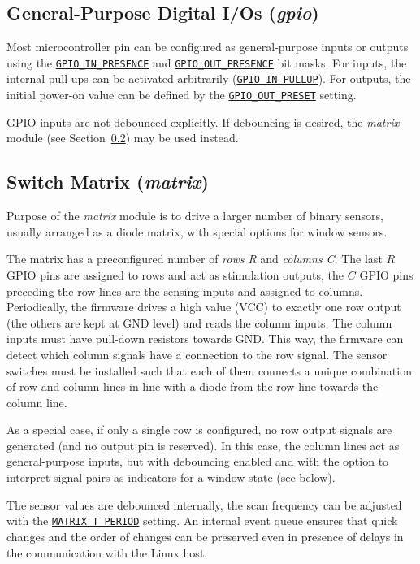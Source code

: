 \documentclass[12pt,english,parskip=half,headheight=19pt]{scrreprt}
\newcommand{\refapic}[1]{\href{home2l-api_c/index.html}{\mbox{\texttt{#1}}}}            %
\begin{document}
\subsection{General-Purpose Digital I/Os (\textit{gpio})}
\label{sec:brownies-features-gpio}

Most microcontroller pin can be configured as general-purpose inputs or outputs using the  \refapic{GPIO\_IN\_PRESENCE} and \refapic{GPIO\_OUT\_PRESENCE} bit masks. For inputs, the internal pull-ups can be activated arbitrarily (\refapic{GPIO\_IN\_PULLUP}). For outputs, the initial power-on value can be defined by the \refapic{GPIO\_OUT\_PRESET} setting.

GPIO inputs are not debounced explicitly. If debouncing is desired, the \textit{matrix} module (see Section~\ref{sec:brownies-features-matrix}) may be used instead.



\subsection{Switch Matrix (\textit{matrix})}
\label{sec:brownies-features-matrix}

Purpose of the \textit{matrix} module is to drive a larger number of binary sensors, usually arranged as a diode matrix, with special options for window sensors.

The matrix has a preconfigured number of \textit{rows R} and \textit{columns C}. The last $R$ GPIO pins are assigned to rows and act as stimulation outputs, the $C$ GPIO pins preceding the row lines are the sensing inputs and assigned to columns. Periodically, the firmware drives a high value (VCC) to exactly one row output (the others are kept at GND level) and reads the column inputs. The column inputs must have pull-down resistors towards GND. This way, the firmware can detect which column signals have a connection to the row signal. The sensor switches must be installed such that each of them connects a unique combination of row and column lines in line with a diode from the row line towards the column line.

As a special case, if only a single row is configured, no row output signals are generated (and no output pin is reserved). In this case, the column lines act as general-purpose inputs, but with debouncing enabled and with the option to interpret signal pairs as indicators for a window state (see below).

The sensor values are debounced internally, the scan frequency can be adjusted with the \refapic{MATRIX\_T\_PERIOD} setting. An internal event queue ensures that quick changes and the order of changes can be preserved even in presence of delays in the communication with the Linux host.
\end{document}
